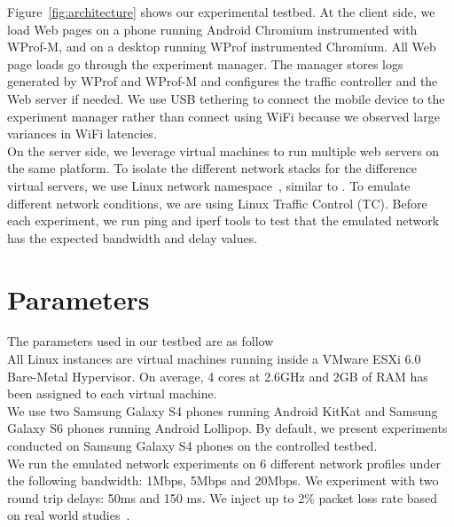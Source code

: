 \noindent Figure~\ref{fig:architecture} shows our experimental testbed. At the client side, we load Web pages on a phone running Android Chromium instrumented with WProf-M, and on a desktop running WProf instrumented Chromium. All Web page loads go through the experiment manager. The manager stores logs generated by WProf and WProf-M and configures the traffic controller and the Web server if needed.  We use USB tethering to connect the mobile device to the experiment manager rather than connect using WiFi because we observed large variances in WiFi latencies.\\

\noindent On the server side, we leverage virtual machines to run multiple web servers on the same platform. To isolate the different network stacks for the difference virtual servers, we use Linux network namespace~\cite{namespace}, similar to \cite{mahimahi}.  To emulate different network conditions, we are using  Linux Traffic Control (TC). Before each experiment, we run ping and iperf tools to test that the emulated network has the expected bandwidth and delay values. 

\section{Parameters}
\label{sec:parameters}

The parameters used in our testbed are as follow\\

{} All Linux instances are virtual machines running inside a VMware ESXi 6.0  Bare-Metal Hypervisor. On average, 4 cores at 2.6GHz and 2GB of RAM has been assigned to each virtual machine. \\

\noindent We use two Samsung Galaxy S4 phones running Android KitKat and Samsung Galaxy S6 phones running Android Lollipop. 
By default, we present experiments conducted on Samsung Galaxy S4 phones on the controlled testbed. \\

{} We run the emulated network experiments on 6 different network profiles under the following bandwidth: 1Mbps, 5Mbps and 20Mbps. We experiment with two round trip delays: 50ms and 150 ms. We inject up to 2\% packet loss rate based on real world studies~\cite{dukkipati_imc2011}.\\
   
